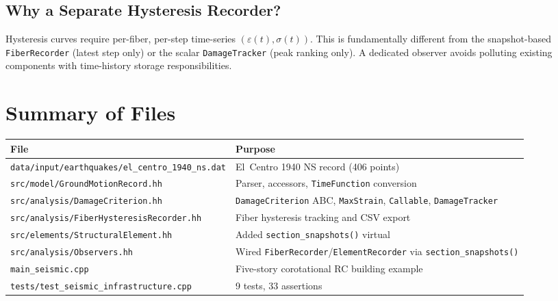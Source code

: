 \subsection{Why a Separate Hysteresis Recorder?}

Hysteresis curves require per-fiber, per-step time-series
$(\varepsilon(t), \sigma(t))$.  This is fundamentally different
from the snapshot-based \texttt{FiberRecorder} (latest step only)
or the scalar \texttt{DamageTracker} (peak ranking only).
A dedicated observer avoids polluting existing components
with time-history storage responsibilities.


\section{Summary of Files}
\label{sec:seismic-file-summary}

\begin{center}
\begin{tabular}{lp{8.5cm}}
  \toprule
  File & Purpose \\
  \midrule
  \texttt{data/input/earthquakes/el\_centro\_1940\_ns.dat}
    & El~Centro 1940 NS record (406 points) \\
  \texttt{src/model/GroundMotionRecord.hh}
    & Parser, accessors, \texttt{TimeFunction} conversion \\
  \texttt{src/analysis/DamageCriterion.hh}
    & \texttt{DamageCriterion} ABC, \texttt{MaxStrain},
      \texttt{Callable}, \texttt{DamageTracker} \\
  \texttt{src/analysis/FiberHysteresisRecorder.hh}
    & Fiber hysteresis tracking and CSV export \\
  \texttt{src/elements/StructuralElement.hh}
    & Added \texttt{section\_snapshots()} virtual \\
  \texttt{src/analysis/Observers.hh}
    & Wired \texttt{FiberRecorder}/\texttt{ElementRecorder}
      via \texttt{section\_snapshots()} \\
  \texttt{main\_seismic.cpp}
    & Five-story corotational RC building example \\
  \texttt{tests/test\_seismic\_infrastructure.cpp}
    & 9 tests, 33 assertions \\
  \bottomrule
\end{tabular}
\end{center}
